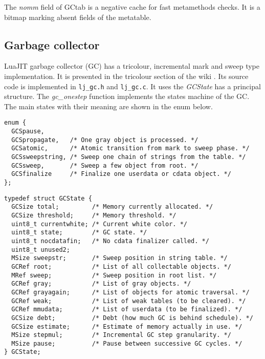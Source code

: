 The \emph{nomm} field of GCtab is a negative cache for fast metamethods checks. It is a bitmap marking absent fields of the metatable.

\subsection{Garbage collector}
\label{Subsec:gc}

LuaJIT garbage collector (GC) has a tricolour, incremental mark and sweep type implementation. It is presented in the tricolour section of the wiki \cite{luajit-gc}. Its source code is implemented in \texttt{lj\_gc.h} and \texttt{lj\_gc.c}. It uses the \textit{GCState} has a principal structure. The \emph{gc\_onestep} function implements the states machine of the GC. The main states with their meaning are shown in the enum below.

\begin{lstlisting}[style=CStyle]
enum {
  GCSpause,
  GCSpropagate,   /* One gray object is processed. */
  GCSatomic,      /* Atomic transition from mark to sweep phase. */
  GCSsweepstring, /* Sweep one chain of strings from the table. */
  GCSsweep,       /* Sweep a few object from root. */
  GCSfinalize     /* Finalize one userdata or cdata object. */
};
\end{lstlisting}

\begin{lstlisting}[style=CStyle]
typedef struct GCState {
  GCSize total;         /* Memory currently allocated. */
  GCSize threshold;     /* Memory threshold. */
  uint8_t currentwhite; /* Current white color. */
  uint8_t state;        /* GC state. */
  uint8_t nocdatafin;   /* No cdata finalizer called. */
  uint8_t unused2;
  MSize sweepstr;       /* Sweep position in string table. */
  GCRef root;           /* List of all collectable objects. */
  MRef sweep;           /* Sweep position in root list. */
  GCRef gray;           /* List of gray objects. */
  GCRef grayagain;      /* List of objects for atomic traversal. */
  GCRef weak;           /* List of weak tables (to be cleared). */
  GCRef mmudata;        /* List of userdata (to be finalized). */
  GCSize debt;          /* Debt (how much GC is behind schedule). */
  GCSize estimate;      /* Estimate of memory actually in use. */
  MSize stepmul;        /* Incremental GC step granularity. */
  MSize pause;          /* Pause between successive GC cycles. */
} GCState;
\end{lstlisting}

